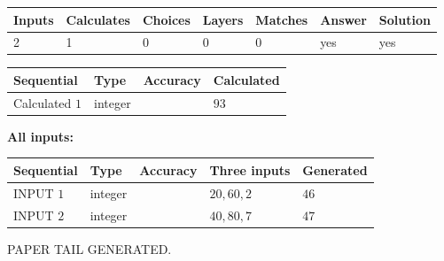\documentclass[12pt]{article}
\begin{document}
 
\noindent{}
 
 

 
   
   
   
   
\noindent\begin{tabular}{|l|l|l|l|l|l|l|}
 \hline
Inputs & Calculates & Choices & Layers & Matches & Answer & Solution \\ \hline
 2  & 
 1  & 
 0
  & 
 0  & 
 0  & 
  yes & 
  yes 
  \\ \hline
 \end{tabular}
   
   
   
   
\noindent{}
   
   
  
  
\noindent\begin{tabular}{|l|l|l|l|}
\hline
 Sequential & Type & Accuracy & Calculated \\ 
\hline
 
 
  Calculated $  1 $ & integer &  & 
  $ 93 $ 
 \\  \hline  
 \end{tabular}
   
   
   
   
\noindent\vspace{0.1in}\hspace{-0.08in} {\textbf{\Large{All inputs: }}}
   
   
  
  
\noindent\begin{tabular}{|l|l|l|l|l|}
\hline
 Sequential & Type & Accuracy & Three inputs & Generated \\ 
\hline
 
 
  INPUT $  1 $ & integer &  & $
 20
 , 
 60
 , 
 2
 $ & $ 46 $ 
 \\  \hline  
 
 
  INPUT $  2 $ & integer &  & $
 40
 , 
 80
 , 
 7
 $ & $ 47 $ 
 \\  \hline  
 \end{tabular}
   
   
   
   
   
   
 \vspace{0.2in}
 
   
   
\vspace{2.0in} PAPER TAIL GENERATED.
   
\end{document}
